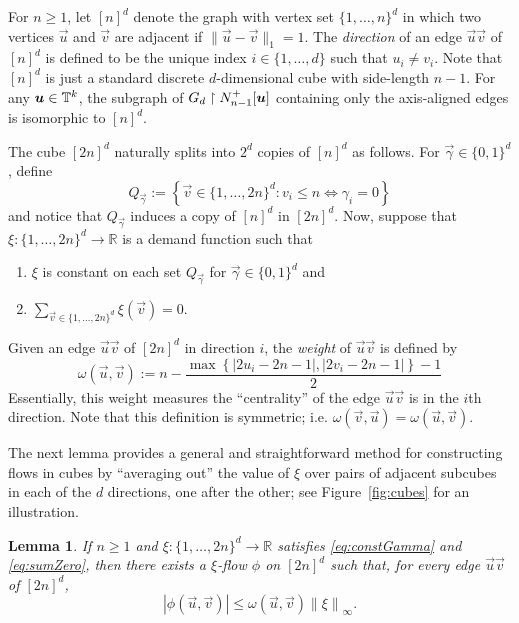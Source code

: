 \documentclass[12pt,a4paper]{amsart}
\numberwithin{equation}{section}
\newtheorem{lemma}[equation]{Lemma}
\theoremstyle{definition}
\begin{document}
For $n\geq1$, let $[n]^d$ denote the graph with vertex set $\{1,\dots,n\}^d$ in which two vertices $\vec{u}$ and $\vec{v}$ are adjacent if $\|\vec{u}-\vec{v}\|_1=1$. The \emph{direction} of an edge $\vec{u}\vec{v}$ of $[n]^d$ is defined to be the unique index $i\in\{1,\dots,d\}$ such that $u_i\neq v_i$. Note that $[n]^d$ is just a standard discrete $d$-dimensional cube with side-length $n-1$. For any $\boldsymbol{u}\in\mathbb{T}^k$, the subgraph of $G_d\upharpoonright N_{n-1}^+[\boldsymbol{u}]$ containing only the axis-aligned edges is isomorphic to $[n]^d$.  

The cube $[2n]^d$ naturally splits into $2^d$ copies of $[n]^d$ as follows. For $\vec{\gamma}\in\{0,1\}^d$, define
\[Q_{\vec{\gamma}}:=\left\{\vec{v}\in \{1,\dots,2n\}^d: v_i \leq n \Longleftrightarrow \gamma_i=0\right\}\]
and notice that $Q_{\vec{\gamma}}$ induces a copy of $[n]^d$ in $[2n]^d$. Now, suppose that $\xi:\{1,\dots,2n\}^d\to\mathbb{R}$ is a demand function such that
\begin{enumerate}
\item\label{eq:constGamma} $\xi$ is  constant on each set $Q_{\vec{\gamma}}$ for $\vec{\gamma}\in\{0,1\}^d$ and
\item\label{eq:sumZero} $\sum_{\vec{v}\in\{1,\dots,2n\}^d}\xi(\vec{v})=0$. 
\end{enumerate}
Given an edge $\vec{u}\vec{v}$ of $[2n]^d$ in direction $i$, the \emph{weight} of $\vec{u}\vec{v}$ is defined by
\begin{equation}\label{eq:weightDef}\omega(\vec{u},\vec{v}) := n-\frac{\max\left\{|2u_i-2n-1|,|2v_i-2n-1|\right\} - 1}{2}\end{equation}
Essentially, this weight measures the ``centrality'' of the edge $\vec{u}\vec{v}$ is in the $i$th direction. Note that this definition is symmetric; i.e. $\omega(\vec{v},\vec{u})=\omega(\vec{u},\vec{v})$. 

The next lemma provides a general and straightforward method for constructing flows in cubes by ``averaging out'' the value of $\xi$ over pairs of adjacent subcubes in each of the $d$ directions, one after the other; see Figure~\ref{fig:cubes} for an illustration. 

\begin{lemma}
\label{lem:cubeFlow}
If $n\geq1$ and $\xi:\{1,\dots,2n\}^d\to\mathbb{R}$ satisfies \eqref{eq:constGamma} and \eqref{eq:sumZero}, then there exists a $\xi$-flow $\phi$ on $[2n]^d$ such that, for every edge $\vec{u}\vec{v}$ of $[2n]^d$,
\[|\phi(\vec{u},\vec{v})|\leq \omega(\vec{u},\vec{v})\left\|\xi\right\|_\infty.\]
\end{lemma}
\end{document}
